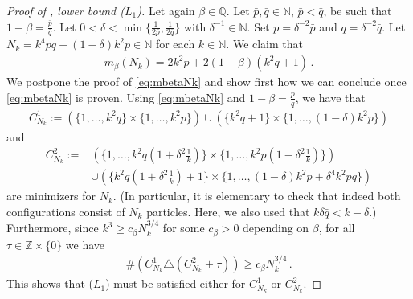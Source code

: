 \documentclass[reqno]{amsart}
\theoremstyle{plain}
\theoremstyle{definition}
\numberwithin{equation}{section}
\newcommand{\N}{\mathbb{N}}
\begin{document}
 \begin{proof}[Proof of ,  lower bound   {\rm ($L_1$)}]   Let again $\beta \in \mathbb{Q}$. Let $\bar{p},\bar{q} \in \mathbb{N}$, $\bar{p} <\bar{q}$, be such that $ 1-\beta  =\frac{\bar{p}}{\bar{q}}$. Let $0<\delta <   \min\{\tfrac{1}{2\bar{p}}, \tfrac{1}{2\bar{q}}\}$ with $\delta^{-1} \in \N$. Set $p = \delta^{-2} \bar{p}$ and $q = \delta^{-2} \bar{q}$.   Let $N_k = k^4 pq +(1-\delta)k^2p \in \N$  for each $k \in \N$.  We claim that
\begin{align}\label{eq:mbetaNk}
m_\beta(N_k) = 2k^2p + 2(1-\beta)(k^2q+1)\,.
\end{align}
We postpone the proof of \eqref{eq:mbetaNk} and show first how we can
conclude once  \eqref{eq:mbetaNk}  is proven. Using \eqref{eq:mbetaNk} and $ 1-\beta  =\frac{p}{q}$, we have that
\begin{align*}
C_{N_k}^1:= \left(\{1,\ldots,k^2q\}\times \{1,\ldots,k^2p\}\right) \cup \left(\{k^2q+1\} \times \{1,\ldots,(1-\delta)k^2p\}\right)
\end{align*}
and 
\begin{align*}
C_{N_k}^2:= &\left(\{1,\ldots,k^2q(1+\delta^2\frac{1}{k})\}\times \{1,\ldots,k^2p(1-\delta^2\frac{1}{k})\}\right) \\&\cup \left(\{k^2q(1+\delta^2\frac{1}{k})+1\}\times \{1,\ldots,(1-\delta)k^2p +\delta^4k^2pq\}\right)
\end{align*}
are minimizers for $N_k$. (In particular, it is elementary to check
that indeed both configurations consist of $N_k$  particles.    Here, we also
used that $k\delta \bar{q} <k - \delta$.)     Furthermore, since $  k^3\ge c_\beta N_k^{3/4}$ for some $c_\beta>0$ depending on
$\beta$,  for  all   $\tau \in \mathbb{Z}\times \{0\}$ we have  
\begin{align*}
\#(C_{N_k}^1\triangle (C_{N_k}^2+\tau)) \geq c_\beta   N_k^{3/4}\,.
\end{align*}
This shows that {\rm ($L_1$)}  must be satisfied either for $C_{N_k}^1$ or $C_{N_k}^2$.


\end{proof}
\end{document}
